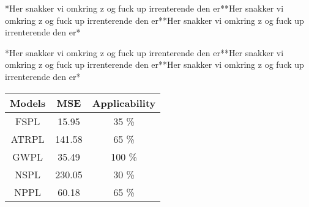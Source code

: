 \large


*Her snakker vi omkring z og fuck up irrenterende den er**Her snakker vi omkring z og fuck up irrenterende den er**Her snakker vi omkring z og fuck up irrenterende den er*


*Her snakker vi omkring z og fuck up irrenterende den er**Her snakker vi omkring z og fuck up irrenterende den er**Her snakker vi omkring z og fuck up irrenterende den er*
\begin{center}
\begin{tabular}{|c|c|c|}
\hline
\textbf{Models} & \textbf{MSE} & \textbf{Applicability} \\ \hline
FSPL            & 15.95        & 35 \%                  \\ \hline
ATRPL 		    & 141.58       & 65 \%                  \\ \hline %
GWPL            & 35.49        & 100 \%                 \\ \hline
NSPL            & 230.05       & 30 \%                  \\ \hline
NPPL            & 60.18        & 65 \%                  \\ \hline
\end{tabular}
\end{center}
\vspace{0.5em}